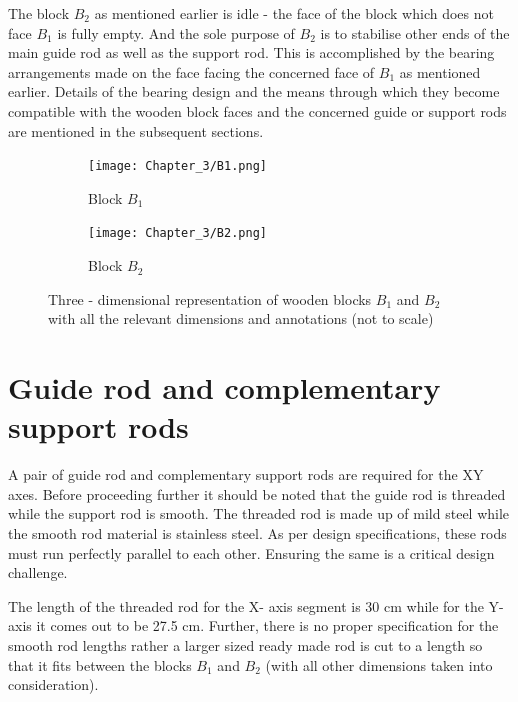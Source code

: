 The block $B_{2}$ as mentioned earlier is idle - the face of the block which does not face $B_{1}$ is fully empty. And the sole purpose of $B_{2}$ is to stabilise other ends of the main guide rod as well as the support rod. This is accomplished by the bearing arrangements made on the face facing the concerned face of $B_{1}$ as mentioned earlier. Details of the bearing design and the means through which they become compatible with the wooden block faces and the concerned guide or support rods are mentioned in the subsequent sections.

\begin{figure}[h]

 \begin{subfigure}{0.5\textwidth}
  \hspace{8mm}
  \texttt{[image: Chapter\_3/B1.png]}
  \caption{Block $B_{1}$}
  \label{fig:b1}
 \end{subfigure}
 \begin{subfigure}{0.5\textwidth}
  \hspace{8mm}
  \texttt{[image: Chapter\_3/B2.png]}
  \caption{Block $B_{2}$}
  \label{fig:b2}
 \end{subfigure}

 \caption{Three - dimensional representation of wooden blocks $B_{1}$ and $B_{2}$ with all the relevant dimensions and annotations (not to scale)}
 \label{fig:b1b2}
\end{figure}


\section{Guide rod and complementary support rods}

A pair of guide rod and complementary support rods are required for the XY axes. Before proceeding further it should be noted that the guide rod is threaded while the support rod is smooth. The threaded rod is made up of mild steel while the smooth rod material is stainless steel. As per design specifications, these rods must run perfectly parallel to each other. Ensuring the same is a critical design challenge. \par

The length of the threaded rod for the X- axis segment is 30 cm while for the Y- axis it comes out to be 27.5 cm. Further, there is no proper specification for the smooth rod lengths rather a larger sized ready made rod is cut to a length so that it fits between the blocks $B_{1}$ and $B_{2}$ (with all other dimensions taken into consideration). \par

